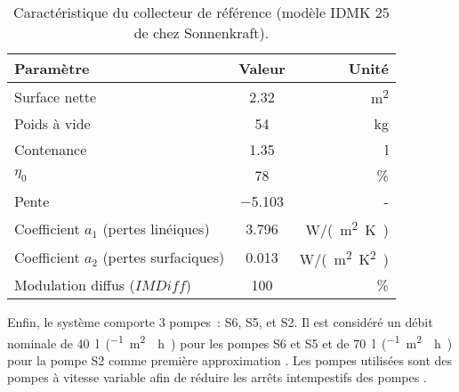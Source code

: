 \begin{table}
\centering
\caption{Caractéristique du collecteur de référence (modèle IDMK 25 de chez Sonnenkraft).}
\label{tab:idmk_specs}
\begin{tabular}{lcr}
    \toprule
    Paramètre                                & Valeur         & Unité                 \\
    \midrule
    Surface nette                            & \num{2.32}           & \si{m^{2}}            \\
    Poids à vide                             & \num{54}             & \si{kg}               \\
    Contenance                               & \num{1.35}           & \si{l}                \\
    $\eta_{0}$                               & \num{78}             & \si{\%}               \\
    Pente                                    & \num{-5.103}         & -                     \\
    Coefficient $a_{1}$ (pertes linéiques)   & \num{3.796}          & \si{W/(m^{2}.K)}      \\
    Coefficient $a_{2}$ (pertes surfaciques) & \num{0.013}          & \si{W/(m^{2}.K^{2})}  \\
    Modulation diffus ($IMDiff$)             & \num{100}            & \si{\%}               \\
    \bottomrule
\end{tabular}
\end{table}


Enfin, le système comporte 3 pompes~: S6, S5, et S2. Il est considéré un débit nominale de \SI{40}{\litre\per(\meter\squared\period\hour)}
pour les pompes S6 et S5 et de \SI{70}{\litre\per(\meter\squared\period\hour)} pour la pompe S2 comme
première approximation \parencite{Peuser2005}. Les pompes utilisées sont des pompes à vitesse variable
afin de réduire les arrêts intempestifs des pompes \parencite{Kicsiny20123489}.



